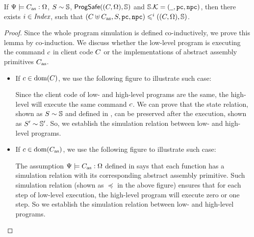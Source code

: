 \begin{lemma}
    \label{lemma:function sim implies whole program sim}
    If ${\Psi} \models {C_{\text{as}}} : {\Omega}$,
    ${S} \sim {\mathbb{S}}$,
    {\em $\textsf{ProgSafe}((C, \Omega), \mathbb{S})$} and
    {\em $\mathbb{S}.\mathcal{K} = (\underline{\ \,}, \texttt{pc}, \texttt{npc})$},
    then there exists $i \in \textit{Index}$, such that  
    {\em $(C\uplus C_{\text{as}}, S, \texttt{pc}, \texttt{npc})
        \leqslant^{i} ((C, \Omega), \mathbb{S})$}.
\end{lemma}
\begin{proof}
    Since the whole program simulation is defined
    co-inductively, we prove this lemma by co-induction.
    We discuss whether the low-level program
    is executing the command $c$ in client code
    $C$ or the implementations of
    abstract assembly primitives $C_{\text{as}}$.
    \begin{itemize}
        \item If $c \in \text{dom}(C)$, we use the
            following figure to illustrate such case:
            \begin{center}
                \vspace*{-0.5em}
                
                \vspace*{-0.5em}
            \end{center}
            Since the client code of low- and high-level
            programs are the same, the high-level will
            execute the same command $c$.
            We can prove that
            the state relation, shown as ${S} \sim {\mathbb{S}}$
            and defined in \Sec{\ref{subsec:correctness-primitive}},
            can be preserved after the execution, shown
            as ${S'} \sim {\mathbb{S}'}$. So, we
            establish the simulation relation between
            low- and high-level programs.

        \item If $c \in \text{dom}(C_{\text{as}})$, we use the
            following figure to illustrate such case:
            \begin{center}
                \vspace*{-0.5em}
                
                \vspace*{-0.5em}
            \end{center}
            The assumption ${\Psi} \models {C_{\text{as}}} : {\Omega}$
            defined in \Def{\ref{def:wdprim-sem}} says that
            each \sparc{} function has a simulation relation
            with its corresponding abstract assembly primitive.
            Such simulation relation
            (shown as $\preccurlyeq$ in the above figure)
            ensures that for each step
            of low-level execution, the high-level program will
            execute zero or one step. So we
            establish the simulation relation between
            low- and high-level programs.
    \end{itemize}


\end{proof}
